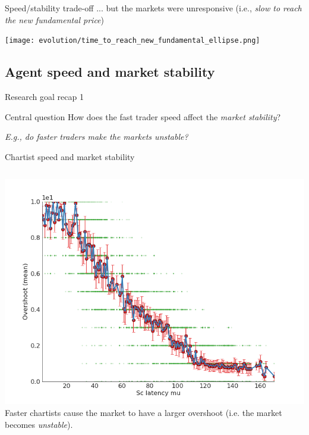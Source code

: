 \documentclass[14pt]{beamer}
\begin{document}
\begin{frame}{Speed/stability trade-off}
... but the markets were \color{red} unresponsive \color{black} (i.e., \textit{slow to reach the new fundamental price})
\begin{center}
\texttt{[image: evolution/time\_to\_reach\_new\_fundamental\_ellipse.png]}
\end{center}
\end{frame}




\subsection{Agent speed and market stability}
\begin{frame}
\tableofcontents[currentsubsection]
\end{frame}


\begin{frame}{Research goal recap 1}
\begin{block}{Central question}
How does the \color{red} fast trader speed \color{black} affect the \textit{market stability}?
\end{block}
\vspace{0.2in}
\pause
\textit{E.g., do faster traders make the markets unstable?}
\end{frame}

\begin{frame}{Chartist speed and market stability}
\begin{columns}[c]
\column{2in}
\includegraphics[width=1.3\textwidth]{scatter/sc_latency_mu__vs__overshoot(mean)_scatter.png}
\column{1.5in}
\color{red} Faster chartists \color{black} cause the market to have a \color{red} larger overshoot\color{black} (i.e. the market becomes \textit{unstable}).
\end{columns}
\end{frame}
\end{document}
